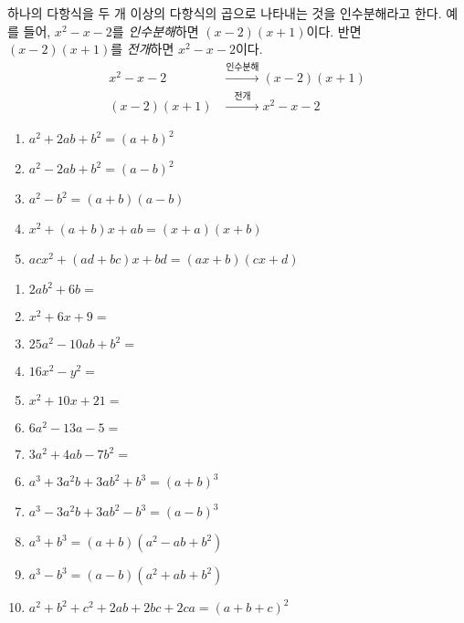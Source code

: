 \documentclass{oblivoir}
\begin{document}
%
\exam{}
하나의 다항식을 두 개 이상의 다항식의 곱으로 나타내는 것을 인수분해라고 한다.
예를 들어, \(x^2-x-2\)를 \emph{인수분해}하면 \((x-2)(x+1)\)이다.
반면 \((x-2)(x+1)\)를 \emph{전개}하면 \(x^2-x-2\)이다.
\begin{align*}
x^2-x-2&\xrightarrow{인수분해}(x-2)(x+1)\\
(x-2)(x+1)&\xrightarrow{\phantom{인}전개\phantom{인}}x^2-x-2
\end{align*}


%
\begin{mdframed}
\begin{enumerate}
\item\label{mult_01}
\(a^2+2ab+b^2=(a+b)^2\)
\item\label{mult_02}
\(a^2-2ab+b^2=(a-b)^2\)
\item\label{mult_03}
\(a^2-b^2=(a+b)(a-b)\)
\item\label{mult_04}
\(x^2+(a+b)x+ab=(x+a)(x+b)\)
\item\label{mult_05}
\(acx^2+(ad+bc)x+bd=(ax+b)(cx+d)\)
\end{enumerate}
\end{mdframed}

%
\begin{enumerate}\label{fact01}
\item
\(2ab^2+6b=\)
\item
\(x^2+6x+9=\)
\item
\(25a^2-10ab+b^2=\)
\item
\(16x^2-y^2=\)
\item
\(x^2+10x+21=\)
\item
\(6a^2-13a-5=\)
\item
\(3a^2+4ab-7b^2=\)
\end{enumerate}

\newpage
%
\begin{mdframed}
\begin{enumerate}
\setcounter{enumi}{5}
\item\label{mult_06}
\(a^3+3a^2b+3ab^2+b^3=(a+b)^3\)
\item\label{mult_07}
\(a^3-3a^2b+3ab^2-b^3=(a-b)^3\)
\item\label{mult_08}
\(a^3+b^3=(a+b)(a^2-ab+b^2)\)
\item\label{mult_09}
\(a^3-b^3=(a-b)(a^2+ab+b^2)\)
\item\label{mult_10}
\(a^2+b^2+c^2+2ab+2bc+2ca=(a+b+c)^2\)
\end{enumerate}
\end{mdframed}
\end{document}
